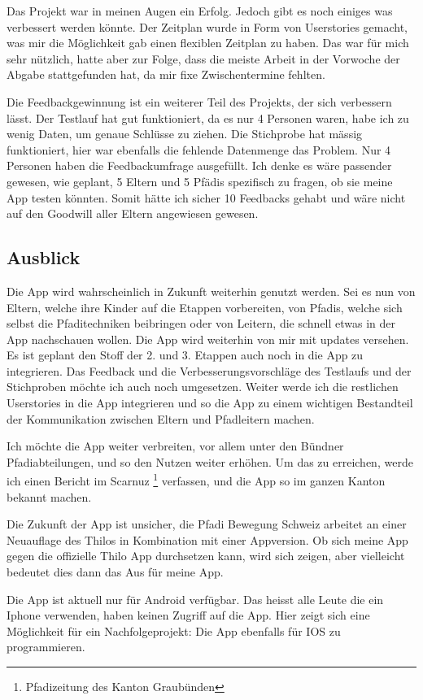 Das Projekt war in meinen Augen ein Erfolg. Jedoch gibt es noch einiges was verbessert werden könnte. Der Zeitplan wurde in Form von Userstories gemacht, was mir die Möglichkeit gab einen flexiblen Zeitplan zu haben. Das war für mich sehr nützlich, hatte aber zur Folge, dass die meiste Arbeit in der Vorwoche der Abgabe stattgefunden hat, da mir fixe Zwischentermine fehlten. \par
Die Feedbackgewinnung ist ein weiterer Teil des Projekts, der sich verbessern lässt. Der Testlauf hat gut funktioniert, da es nur 4 Personen waren, habe ich zu wenig Daten, um genaue Schlüsse zu ziehen. Die Stichprobe hat mässig funktioniert, hier war ebenfalls die fehlende Datenmenge das Problem. Nur 4 Personen haben die Feedbackumfrage ausgefüllt. Ich denke es wäre passender gewesen, wie geplant, 5 Eltern und 5 Pfädis spezifisch zu fragen, ob sie meine App testen könnten. Somit hätte ich sicher 10 Feedbacks gehabt und wäre nicht auf den Goodwill aller Eltern angewiesen gewesen.

\subsection{Ausblick}

Die App wird wahrscheinlich in Zukunft weiterhin genutzt werden. Sei es nun von Eltern, welche ihre Kinder auf die Etappen vorbereiten, von Pfadis, welche sich selbst die Pfaditechniken beibringen oder von Leitern, die schnell etwas in der App nachschauen wollen. Die App wird weiterhin von mir mit updates versehen. Es ist geplant den Stoff der 2. und 3. Etappen auch noch in die App zu integrieren. Das Feedback und die Verbesserungsvorschläge des Testlaufs und der Stichproben möchte ich auch noch umgesetzen. Weiter werde ich die restlichen Userstories in die App integrieren und so die App zu einem wichtigen Bestandteil der Kommunikation zwischen Eltern und Pfadleitern machen. \par
Ich möchte die App weiter verbreiten, vor allem unter den Bündner Pfadiabteilungen, und so den Nutzen weiter erhöhen. Um das zu erreichen, werde ich einen Bericht im Scarnuz \footnote{Pfadizeitung des Kanton Graubünden} verfassen, und die App so im ganzen Kanton bekannt machen. \par
Die Zukunft der App ist unsicher, die Pfadi Bewegung Schweiz arbeitet an einer Neuauflage des Thilos in Kombination mit einer Appversion. Ob sich meine App gegen die offizielle Thilo App durchsetzen kann, wird sich zeigen, aber vielleicht bedeutet dies dann das Aus für meine App. \par
Die App ist aktuell nur für Android verfügbar. Das heisst alle Leute die ein Iphone verwenden, haben keinen Zugriff auf die App. Hier zeigt sich eine Möglichkeit für ein Nachfolgeprojekt: Die App ebenfalls für IOS zu programmieren. 